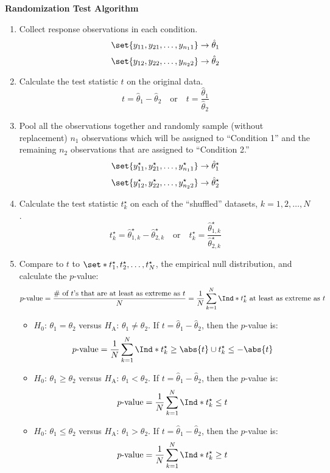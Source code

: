 \begin{framed}
      \textbf{Randomization Test Algorithm}
      \begin{enumerate}
            \item Collect response observations in each condition.
                  \[ \set{y_{11},y_{21},\ldots,y_{n_1 1}}\to \hat{\theta}_1 \]
                  \[ \set{y_{12},y_{22},\ldots,y_{n_2 2}}\to \hat{\theta}_2 \]
            \item Calculate the test statistic $ t $ on the original data.
                  \[ t=\hat{\theta}_1-\hat{\theta}_2\quad\text{or}\quad t=\frac{\hat{\theta}_1}{\hat{\theta}_2} \]
            \item Pool all the observations together and randomly sample (without replacement)
                  $ n_1 $ observations which will be assigned to ``Condition 1'' and the remaining $ n_2 $
                  observations that are assigned to ``Condition 2.''
                  \[ \set{y_{11}^\star,y_{21}^\star,\ldots,y_{n_1 1}^\star}\to \hat{\theta}_1^\star \]
                  \[ \set{y_{12}^\star,y_{22}^\star,\ldots,y_{n_2 2}^\star}\to \hat{\theta}_2^\star \]
            \item Calculate the test statistic $ t_k^\star $ on each of the ``shuffled'' datasets, $ k=1,2,\ldots,N $.
                  \[ t_k^\star=\hat{\theta}_{1,k}^\star-\hat{\theta}_{2,k}^\star\quad\text{or}\quad t_k^\star=\frac{\hat{\theta}_{1,k}^\star}{\hat{\theta}_{2,k}^\star}  \]
            \item Compare to $ t $ to $ \set*{t_1^\star,t_2^\star,\ldots,t_N^\star} $, the empirical
                  null distribution, and calculate the $ p $-value:
                  \[ p\text{-value}=\frac{\text{\# of $t$'s that are at least as extreme as $t$}}{N}=\frac{1}{N} \sum_{k=1}^{N} \Ind*{t_k^\star\text{ at least as extreme as $t$}}  \]
                  \begin{itemize}
                        \item $ H_0 $: $ \theta_1=\theta_2 $ versus $ H_\text{A} $: $ \theta_1\ne \theta_2 $. If $ t=\hat{\theta}_1-\hat{\theta}_2 $, then
                              the $ p $-value is:
                              \[ p\text{-value}=\frac{1}{N} \sum_{k=1}^{N} \Ind*{t_k^\star\ge \abs{t}\cup t_k^\star\le -\abs{t}} \]
                        \item $ H_0 $: $ \theta_1\ge \theta_2 $ versus $ H_\text{A} $: $ \theta_1<\theta_2 $. If $ t=\hat{\theta}_1-\hat{\theta}_2 $, then
                              the $ p $-value is:
                              \[ p\text{-value}=\frac{1}{N} \sum_{k=1}^{N} \Ind*{t_k^\star\le t} \]
                        \item $ H_0 $: $ \theta_1\le \theta_2 $ versus $ H_\text{A} $: $ \theta_1>\theta_2 $. If $ t=\hat{\theta}_1-\hat{\theta}_2 $, then
                              the $ p $-value is:
                              \[ p\text{-value}=\frac{1}{N} \sum_{k=1}^{N} \Ind*{t_k^\star\ge t} \]
                  \end{itemize}
      \end{enumerate}
\end{framed}
